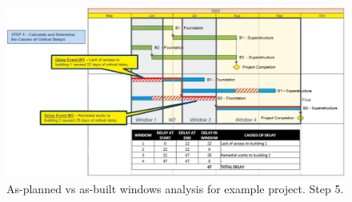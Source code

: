 \begin{figure}[H]
    \centering
    \includegraphics[width = \textwidth]{img/figure40.png}
    \caption{As-planned vs as-built windows analysis for example project. Step 5.}
\end{figure}
